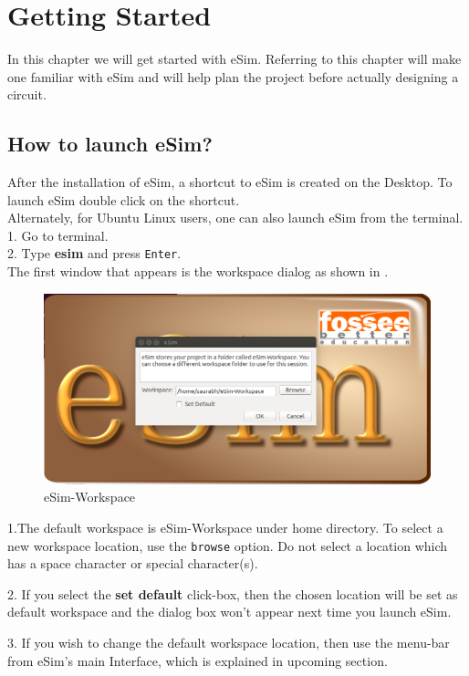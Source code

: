 \chapter {Getting Started}
\thispagestyle{empty}
\label{chap4}

In this chapter we will get started with eSim. Referring to
this chapter will make one familiar with eSim and will help
plan the project before actually designing a circuit. 

\section{How to launch eSim?}
After the installation of eSim, a shortcut to eSim is created 
on the Desktop. To launch eSim double click on the shortcut.\\ 
Alternately, for Ubuntu Linux users, one can also launch eSim from the terminal.\\
1. Go to terminal.\\
2. Type \textbf{esim} and press {\tt Enter}.\\

The first window that appears is the workspace dialog as shown in 
. 
\begin{figure}[h]
\centering
\includegraphics[width=\lgfig]{workspace.png} 
\caption{eSim-Workspace}
\label{workspace}
\end{figure}

\item 1.The default workspace is eSim-Workspace under home directory. 
To select a new workspace location, use the {\tt browse} option. Do not select a location which has a space character or special character(s). 
\item 2. If you select the \textbf{set default} click-box, then the chosen location will be set as default workspace and the dialog box won't appear next time you launch eSim.
\item 3. If you wish to change the default workspace location, then use the menu-bar from eSim's main Interface, which is explained in upcoming section.
